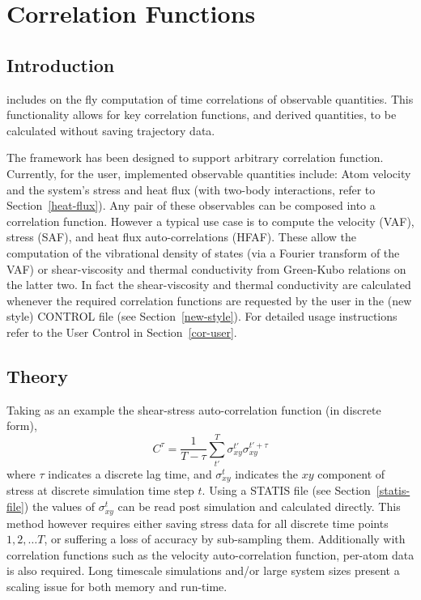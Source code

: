 \section{Correlation Functions}

\subsection{Introduction}
\D includes on the fly computation of time correlations of observable quantities. This functionality allows for 
key correlation functions, and derived quantities, to be calculated
without saving trajectory data. 

The framework has been designed to support arbitrary correlation function. Currently, for the user, implemented observable quantities include: Atom velocity and the system's stress and 
heat flux (with two-body interactions, refer to Section~\ref{heat-flux}). Any pair of these observables can be composed into a correlation function. However a typical use case is to compute the
velocity (VAF), stress (SAF), and heat flux auto-correlations (HFAF). These allow the computation of the vibrational density of states (via a Fourier transform of the VAF) or shear-viscosity and thermal conductivity from Green-Kubo relations on the latter two. In fact the shear-viscosity and thermal conductivity are calculated whenever the required correlation functions are requested by the user in the (new style) CONTROL file (see Section~\ref{new-style}). For detailed usage instructions refer 
to the User Control in Section~\ref{cor-user}.

\subsection{Theory}

Taking as an example the shear-stress auto-correlation function (in discrete form),
\begin{equation}
    C^{\tau} = \frac{1}{T-\tau}\sum_{t'}^{T} \sigma_{xy}^{t'}\sigma_{xy}^{t'+\tau} \label{stress-cor}
\end{equation}
where $\tau$ indicates a discrete lag time, and $\sigma_{xy}^{t}$ indicates the $xy$ component of stress at discrete simulation time step $t$. Using a STATIS file (see Section~\ref{statis-file}) the values of $\sigma_{xy}^{t}$ can be read post simulation and calculated directly. This method however requires either saving stress data for all discrete time points $1,2, \ldots T$, or suffering a loss of accuracy by sub-sampling them. Additionally with correlation functions such as the velocity auto-correlation function, per-atom data is also required. Long timescale simulations and/or large system sizes
present a scaling issue for both memory and run-time.

